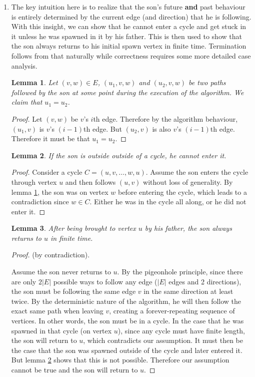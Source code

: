 \documentclass{article}
\newtheorem{lemma}{Lemma}
\begin{document}
\begin{enumerate}
\newpage
\item The key intuition here is to realize that the son's future \textbf{and} past behaviour is entirely determined by the current edge (and direction) that he is following. With this insight, we can show that he cannot enter a cycle and get stuck in it unless he was spawned in it by his father. This is then used to show that the son always returns to his initial spawn vertex in finite time. Termination follows from that naturally while correctness requires some more detailed case analysis.

\begin{lemma}\label{lemma_deter}
Let $(v,w)\in E$, $(u_1,v,w)$ and $(u_2,v,w)$ be two paths followed by the son at some point during the execution of the algorithm. We claim that $u_1=u_2$.
\end{lemma}
\begin{proof}
Let $(v,w)$ be $v$'s $i$th edge. Therefore by the algorithm behaviour, $(u_1,v)$ is $v$'s $(i-1)$th edge. But $(u_2,v)$ is also $v$'s $(i-1)$th edge. Therefore it must be that $u_1=u_2$.
\end{proof}

\begin{lemma}\label{lemma_entercycle}
If the son is outside outside of a cycle, he cannot enter it.
\end{lemma}
\begin{proof}
Consider a cycle $C=(u,v,\dotsc,w,u)$. Assume the son enters the cycle through vertex $u$ and then follows $(u,v)$ without loss of generality. By lemma \ref{lemma_deter}, the son was on vertex $w$ before entering the cycle, which leads to a contradiction since $w \in C$. Either he was in the cycle all along, or he did not enter it.
\end{proof}

\begin{lemma}\label{lemma_finite}
After being brought to vertex $u$ by his father, the son always returns to $u$ in finite time.
\end{lemma}
\begin{proof} (by contradiction).

Assume the son never returns to $u$. By the pigeonhole principle, since there are only $2|E|$ possible ways to follow any edge ($|E|$ edges and 2 directions), the son must be following the same edge $v$ in the same direction at least twice. By the deterministic nature of the algorithm, he will then follow the exact same path when leaving $v$, creating a forever-repeating sequence of vertices. In other words, the son must be in a cycle. In the case that he was spawned in that cycle (on vertex $u$), since any cycle must have finite length, the son will return to $u$, which contradicts our assumption. It must then be the case that the son was spawned outside of the cycle and later entered it. But lemma \ref{lemma_entercycle} shows that this is not possible. Therefore our assumption cannot be true and the son will return to $u$.
\end{proof}


\end{enumerate}
\end{document}
